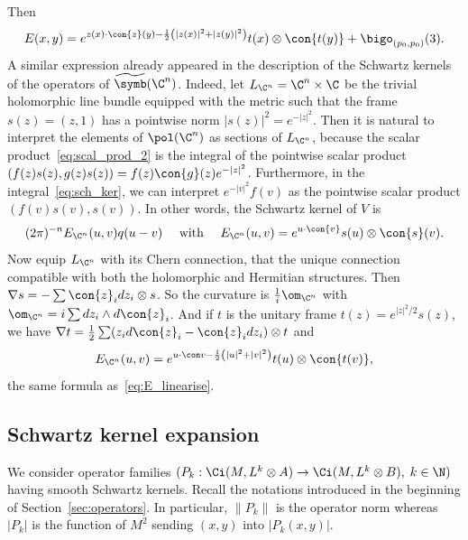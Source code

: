Then
\begin{equation}\label{eq:E_linearise}
E(x,y) = e^{ z(x) \cdot \con{z} (y) -\frac{1}{2} \left(|z(x)|^2 + |z (y)|^2\right)} t(x) \otimes \con{t(y)} + \bigo_{\left(p_0, p_0\right)} (3).
\end{equation}
A similar expression already appeared in the description of the Schwartz kernels of the operators of $\widetilde{\symb} (\C^n)$. Indeed, let $L_{\C^n}= \C^n \times \C$ be the trivial holomorphic line bundle equipped with the metric such that the frame $s(z) = (z,1)$ has a pointwise norm $|s(z)|^2 = e^{-|z|^2}$. Then it is natural to interpret the elements of $\pol (\C^n)$ as sections of $L_{\C^n}$, because the scalar product~\eqref{eq:scal_prod_2} is the integral of the pointwise scalar product $(f (z) s(z), g(z) s(z)) = f(z) \con{g} (z) e^{-|z|^2}$. Furthermore, in the integral~\eqref{eq:sch_ker}, we can interpret $e^{-|v|^2} f(v)$ as the pointwise scalar product $(f(v) s(v), s(v))$. In other words, the Schwartz kernel of $V$ is
\begin{equation}\label{eq:2pin-e_cn-u}
(2\pi)^{-n} E_{\C^n} (u,v) q(u-v) \quad \text{ with }
\quad E_{\C^n}(u,v) =e^{u \cdot \con{v}} s(u) \otimes \con{s}(v).
\end{equation}
Now equip $L_{\C^n}$ with its Chern connection, that the unique connection compatible with both the holomorphic and Hermitian structures. Then $\nabla s = - \sum \con{z}_i dz_i \otimes s$. So the curvature is $\frac{1}{i} \om_{\C^n} $ with $\om_{\C^n} = i \sum dz_i
\wedge d \con{z}_i$. And if $t $ is the unitary frame $t(z) = e^{|z|^2/2} s (z)$, we have $\nabla t = \frac{1}{2} \sum (z_i d \con{z}_i - \con{z}_i d z_i) \otimes t$ and
\[
E_{\C^n}(u,v) = e^{ u \cdot \con v - \frac{1}{2} \left(
|u|^2+ |v|^2\right)} t(u) \otimes \con{t(v)},
\]
the same formula as~\eqref{eq:E_linearise}.

\subsection{Schwartz kernel expansion} \label{sec:global-expansion}


We consider operator families $(P_k : \Ci(M, L^k \otimes A) \rightarrow \Ci(M, L^k \otimes B), \; k \in \N)$ having smooth Schwartz kernels. Recall the notations introduced in the beginning of Section~\ref{sec:operators}. In particular, $\| P_k \|$ is the operator norm whereas $|P_k|$ is the function of $M^2$ sending $(x,y)$ into $|P_k(x,y)|$.

